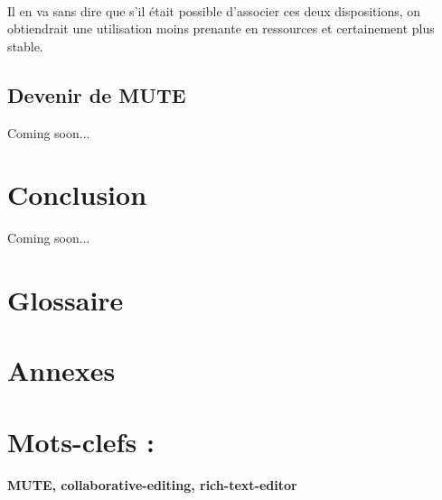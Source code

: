 \documentclass[12pt]{article}
\begin{document}
\paragraph{}
Il en va sans dire que s'il était possible d'associer ces deux dispositions, on obtiendrait une utilisation moins prenante en ressources et certainement plus stable.\\

\subsection{Devenir de MUTE}
Coming soon...

\newpage
{}
\section*{Conclusion}
Coming soon...

\newpage
\printbibliography[heading=bibintoc,title={Webographie}]

\newpage
{}
\section*{Glossaire}

\clearpage

\newpage
{}
\section*{Annexes}

\newpage
\section*{Mots-clefs :}
\textbf{MUTE, collaborative-editing, rich-text-editor}
\end{document}
